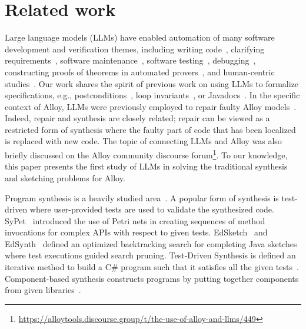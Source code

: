 \section{Related work}
\label{sec:related}

Large language models (LLMs) have enabled automation of many software
development and verification themes, including writing
code~\cite{BairiETALFSE2024,XiaETALFSE2025}, clarifying
requirements~\cite{MuETALFSE2024}, software
maintenance~\cite{DilharaETALFSE2024,JinETALFSE2024,JiangETALFSE2024,MaETALICSE2024,XuETALICSE2024,NamETALICSE2024},
software
testing~\cite{RyanETALFSE2024,LiuETALICSE2024,DinellaETALICSE2022},
debugging~\cite{WadhwaETALFSE2024,KangETAL2024}, constructing proofs
of theorems in automated provers~\cite{FirstETALFSE2024}, and
human-centric studies~\cite{WangETAL2024,ImranETALICSE2024}.  Our work
shares the spirit of previous work on using LLMs to formalize
specifications, e.g., postconditions~\cite{EndresETALFSE2024}, loop
invariants~\cite{ChakrabortyETALEMNLP2023}, or
Javadocs~\cite{JiangETALarXiv2024}.  In the specific context of Alloy,
LLMs were previously employed to repair faulty Alloy
models~\cite{Hasan2023,Alhanahnah2024}.  Indeed, repair and synthesis
are closely related; repair can be viewed as a restricted form of
synthesis where the faulty part of code that has been localized is
replaced with new code.  The topic of connecting LLMs and Alloy was
also briefly discussed on the Alloy community discourse
forum\footnote{\url{https://alloytools.discourse.group/t/the-use-of-alloy-and-llms/449}}.
To our knowledge, this paper presents the first study of LLMs in
solving the traditional synthesis and sketching problems for Alloy.

Program synthesis is a heavily studied
area~\cite{PueliRosnerICALP1989}.  A popular form of synthesis is
test-driven where user-provided tests are used to validate the
synthesized code.  SyPet~\cite{FengETAL2017} introduced the use of
Petri nets in creating sequences of method invocations for complex
APIs with respect to given tests.  EdSketch~\cite{HuaKhurshid2017} and
EdSynth~\cite{YangETAL2017} defined an optimized backtracking search
for completing Java sketches where test executions guided search
pruning.  Test-Driven Synthesis is defined an iterative method to build a
C$\#$ program such that it satisfies all the given tests~\cite{TDS}.
Component-based synthesis constructs programs by putting together
components from given libraries~\cite{oracleCBS}.

